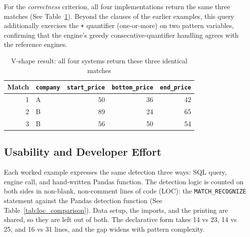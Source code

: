 For the \emph{correctness} criterion, all four implementations return the
same three matches (See Table~\ref{tab:vshape-results}).
Beyond the clauses of the earlier examples, this query additionally
exercises the \texttt{+} quantifier (one-or-more) on two pattern
variables, confirming that the engine's greedy consecutive-quantifier
handling agrees with the reference engines.

\begin{table}[H]
\centering
\caption[V-shape result]{V-shape result: all four systems return these three identical
  matches}
\label{tab:vshape-results}
{\small
\begin{tabular}{rlrrr}
\toprule
\textbf{Match} & \texttt{company} & \texttt{start\_price} & \texttt{bottom\_price} & \texttt{end\_price} \\
\midrule
1 & A & 50 & 36 & 42 \\
2 & B & 89 & 24 & 65 \\
3 & B & 56 & 50 & 54 \\
\bottomrule
\end{tabular}
}
\par{}
\end{table}

\subsection{Usability and Developer Effort}
\label{subsec:eval-usability}

Each worked example expresses the same detection three ways: SQL
query, engine call, and hand-written Pandas function.
The detection logic is counted on both sides in non-blank, non-comment
lines of code (LOC): the \texttt{MATCH\_RECOGNIZE} statement against the
Pandas detection function (See Table~\ref{tab:loc_comparison}).  Data
setup, the
imports, and the printing are shared, so they are left out of both.  The
declarative form takes 14 vs 23, 14 vs 25, and 16 vs 31 lines, and the
gap widens with pattern complexity.

